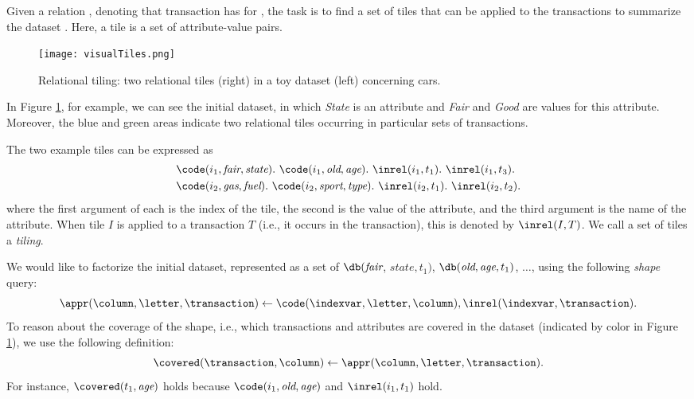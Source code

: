 
Given a relation \dbvars, denoting that transaction \transaction has  for \column, the task is to find a set of tiles that can be applied to the transactions to summarize the dataset \db. Here, a tile is a set of attribute-value pairs.

\begin{figure}[tbh]
	\centering
	\texttt{[image: visualTiles.png]}
	\caption{Relational tiling: two relational tiles (right) in a toy dataset (left) concerning cars.}
	\label{decompositionExampleFigure}
\end{figure}

In Figure \ref{decompositionExampleFigure}, for example, we can see the initial dataset, in which \textit{State} is an attribute and \textit{Fair} and \textit{Good} are values for this attribute.  Moreover, the blue and green areas indicate two relational tiles occurring in particular sets of transactions.

The two example tiles can be expressed as
\begin{align*}
   &\code(i_1,\textit{fair}, \textit{state}).~\code(i_1,\textit{old}, \textit{age}). ~\inrel(i_1,t_1). ~\inrel(i_1,t_3).\\
   &\code(i_2,\textit{gas}, \textit{fuel}).~\code(i_2,\textit{sport}, \textit{type}). ~\inrel(i_2,t_1). ~\inrel(i_2,t_2).
\end{align*}
where the first argument of each \code is the index of the tile, the second is the value of the attribute, and the third argument is the name of the attribute.
When tile $I$ is applied to a transaction $T$ (i.e., it occurs in the transaction), this is denoted by $\inrel(I,T)$. We call a set of tiles a \textit{tiling}.

We would like to factorize the initial dataset, 
represented as a set of $\db(\textit{fair}$, $\textit{state}, t_1)$, $\db(\textit{old},\textit{age},t_1)$, $\dots$,
using the following \textit{shape} query:
\begin{equation}
  \appr(\column,\letter,\transaction) \leftarrow \code(\indexvar,\letter, \column), \inrel(\indexvar,\transaction). %
  \label{tilingshape}
\end{equation}
To reason about the coverage of the shape, i.e., which transactions and attributes are covered in the dataset (indicated by color in Figure \ref{decompositionExampleFigure}), we use the following definition: 
\begin{equation*}
  \covered( \transaction,\column) \leftarrow \appr(\column,\letter,\transaction). %
\end{equation*}
For instance, $\covered(t_1,\textit{age})$ holds because $\code(i_1,\textit{old},\textit{age})$ and $\inrel(i_1,t_1)$ hold. 

